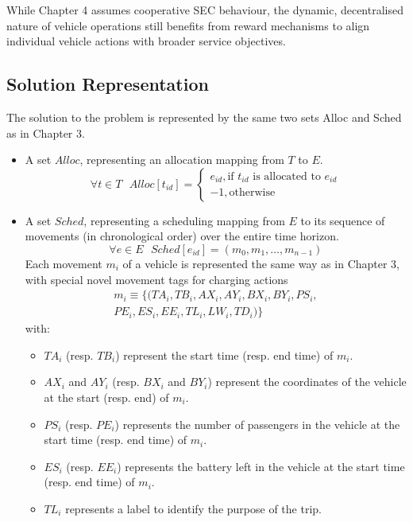 \begin{enumerate}
    While Chapter 4 assumes cooperative SEC behaviour, the dynamic, decentralised nature of vehicle operations still benefits from  reward mechanisms to align individual vehicle actions with broader service objectives.
\end{enumerate}

\subsection{Solution Representation}
The solution to the problem is represented by the same two sets Alloc and Sched as in Chapter 3.

\begin{itemize}
    \item A set $Alloc$, representing an allocation mapping from $T$ to $E$.
    \[
    \forall t \in T \text{ } Alloc[t_{id}] = 
    \begin{cases}
        e_{id},  \text{if }  t_{id} \text{ is allocated to } e_{id}\\
        -1,  \text{otherwise}
    \end{cases}
    \]
    \item A set $Sched$, representing a scheduling mapping from $E$ to its sequence of movements (in chronological order) over the entire time horizon.
    \[
    \forall e \in E \text{ } Sched[e_{id}] = (m_0, m_1, \ldots, m_{n-1})
    \]
    Each movement $m_i$ of a vehicle is represented the same way as in Chapter 3, with special novel movement tags for charging actions
    \begin{align*}
    m_i \equiv \{ (TA_i, TB_i, AX_i, AY_i, BX_i, BY_i, PS_i, \\
        PE_i, ES_i, EE_i, TL_i, LW_i, TD_i) \}
    \end{align*}
    with: 
    \begin{itemize}
        \item $TA_i$ (resp. $TB_i$) represent the start time (resp. end time) of $m_i$.
        \item $AX_i$ and $AY_i$ (resp. $BX_i$ and $BY_i$) represent the coordinates of the vehicle at the start (resp. end) of $m_i$.
        \item $PS_i$ (resp. $PE_i$) represents the number of passengers in the vehicle at the start time (resp. end time) of $m_i$.
        \item $ES_i$ (resp. $EE_i$) represents the battery left in the vehicle at the start time (resp. end time) of $m_i$.
        \item $TL_i$ represents a label to identify the purpose of the trip.

\end{itemize}
\end{itemize}
